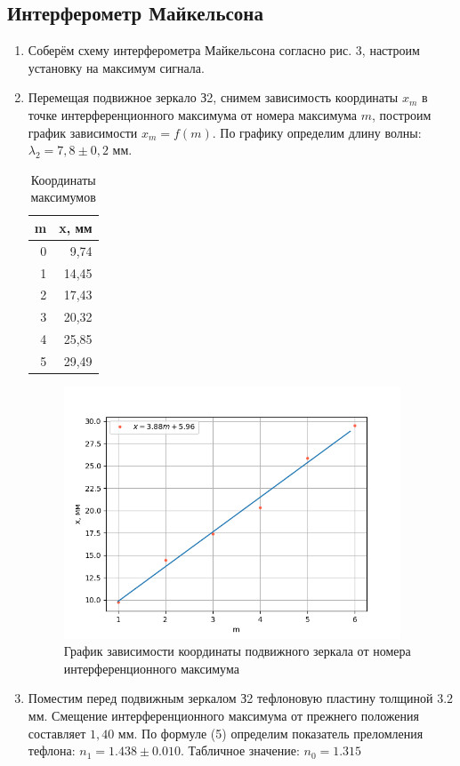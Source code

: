 \documentclass[a4paper,12pt]{article}
\begin{document}
\subsection{Интерферометр Майкельсона}
\begin{enumerate}
    \item Соберём схему интерферометра Майкельсона согласно рис. 3, настроим установку на максимум сигнала. 
    \item Перемещая подвижное зеркало З2, снимем зависимость координаты $x_m$ в точке интерференционного максимума от номера максимума $m$, построим график зависимости $x_m = f(m)$. По графику определим длину волны: $\lambda_2 = 7,8 \pm  0,2$ мм.
    
\begin{table}[h!]
\centering
\begin{tabular}{|r|r|}
\hline
\multicolumn{1}{|l|}{\textbf{m}} & \multicolumn{1}{l|}{\textbf{x, мм}} \\ \hline
0 & 9,74 \\ \hline
1 & 14,45 \\ \hline
2 & 17,43 \\ \hline
3 & 20,32 \\ \hline
4 & 25,85 \\ \hline
5 & 29,49 \\ \hline
\end{tabular}%
\caption{Координаты максимумов}
\label{tab:my-table}
\end{table}
    
\begin{figure}[h]
    \centering
    \includegraphics[width=10cm]{newgraph3.png}
    \caption{График зависимости координаты подвижного зеркала от номера интерференционного максимума}
    \label{fig:vac}
\end{figure}


\item Поместим перед подвижным зеркалом З2 тефлоновую пластину толщиной $3.2$ мм. Смещение интерференционного максимума от прежнего положения составляет $1,40$ мм. По формуле (5) определим показатель преломления тефлона: $n_1 = 1.438 \pm0.010 $. Табличное значение: $n_0  = 1.315$
\end{enumerate}
    
\end{document}
